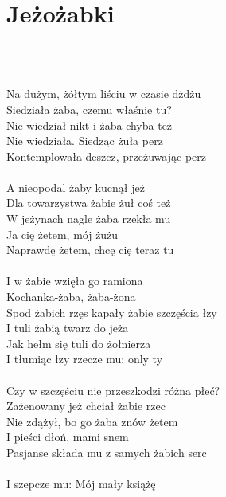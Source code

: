 \documentclass[a5paper, 10pt]{book}
\begin{document}
\section{Jeżożabki}\textcolor{lightgray}{\textit{}}\\~\\
\begin{minipage}[t]{0.8\textwidth}
  Na dużym, żółtym liściu w czasie dżdżu\\
  Siedziała żaba, czemu właśnie tu?\\
  Nie wiedział nikt i żaba chyba też\\
  Nie wiedziała. Siedząc żuła perz\\
  Kontemplowała deszcz, przeżuwając perz\\
  \\
  A nieopodal żaby kucnął jeż\\
  Dla towarzystwa żabie żuł coś też\\
  W jeżynach nagle żaba rzekła mu\\
  Ja cię żetem, mój żużu\\
  Naprawdę żetem, chcę cię teraz tu\\
  \\
  \hspace*{5mm}I w żabie wzięła go ramiona \\
  \hspace*{5mm}Kochanka-żaba, żaba-żona \\
  \hspace*{5mm}Spod żabich rzęs kapały żabie szczęścia łzy\\
  \hspace*{5mm}I tuli żabią twarz do jeża\\
  \hspace*{5mm}Jak hełm się tuli do żołnierza \\
  \hspace*{5mm}I tłumiąc łzy rzecze mu: only ty\\
  \\
  Czy w szczęściu nie przeszkodzi różna płeć?\\
  Zażenowany jeż chciał żabie rzec \\
  Nie zdążył, bo go żaba znów żetem\\
  I pieści dłoń, mami snem \\
  Pasjanse składa mu z samych żabich serc\\
  \\
  \hspace*{5mm}I szepcze mu: Mój mały książę\\

\end{minipage}
\end{document}
